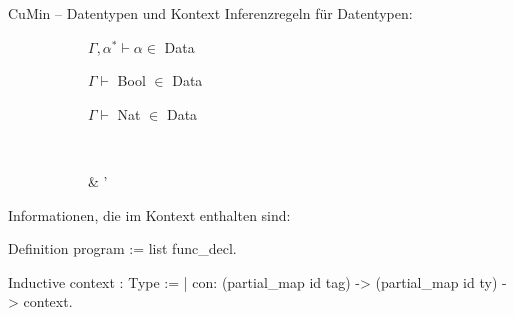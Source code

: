 \documentclass{beamer}
\begin{document}
\begin{frame}[fragile]{CuMin -- Datentypen und Kontext}
Inferenzregeln für Datentypen:
\begin{figure}[H]
	\begin{center}
		\begin{subfigure}{.3 \linewidth}
			\centering
			$\Gamma, \alpha^{*} \vdash \alpha \in$ Data
		\end{subfigure}
		\hfill
		\begin{subfigure}{.3 \linewidth}
			\centering
			$\Gamma \vdash$ Bool $\in$ Data
		\end{subfigure}
		\hfill
		\begin{subfigure}{.3 \linewidth}
			\centering
			$\Gamma \vdash$ Nat $\in$ Data
		\end{subfigure}\\
		\vspace{1em}
		\begin{subfigure}{.375 \linewidth}
			\centering
			{\Gamma \vdash \tau \in {}}
		\end{subfigure}
		\hspace{.1 \linewidth}
		\begin{subfigure}{.375 \linewidth}
			\centering
			{\Gamma \vdash \tau \in {} & \Gamma \vdash \tau' \in {}}
		\end{subfigure}
	\end{center}
\end{figure}
Informationen, die im Kontext enthalten sind:
\begin{coqcode}
  Definition program := list func_decl.

  Inductive context : Type := 
    | con: (partial_map id tag) -> (partial_map id ty) ->
            context.
\end{coqcode}
\end{frame}
\end{document}
